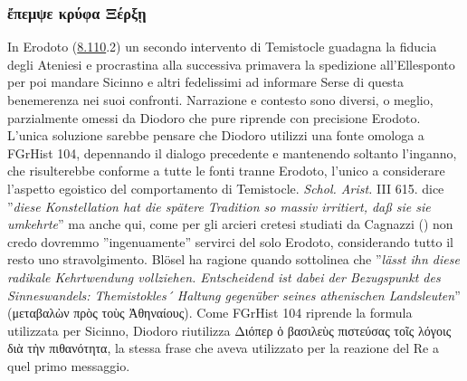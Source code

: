 {    \subsubsection{\textgreek{ἔπεμψε κρύφα Ξέρξῃ}}
    In Erodoto (\href{http://data.perseus.org/citations/urn:cts:greekLit:tlg0016.tlg001.perseus-grc1:8.110}{8.110}.2) un secondo intervento di Temistocle guadagna la fiducia degli Ateniesi e procrastina alla successiva primavera la spedizione all'Ellesponto per poi mandare Sicinno e altri fedelissimi ad informare Serse di questa benemerenza  nei suoi confronti. Narrazione e contesto sono diversi, o meglio, parzialmente omessi da  Diodoro che pure riprende con precisione Erodoto. L'unica soluzione sarebbe pensare che  Diodoro utilizzi una fonte omologa a FGrHist 104, depennando il dialogo precedente e mantenendo soltanto l'inganno, che risulterebbe conforme a tutte le fonti tranne Erodoto, l'unico a considerare l'aspetto egoistico del comportamento di Temistocle.\emph{ Schol. Arist.} III 615. \cite[260 n.27]{Blosel2004} dice ''\emph{diese Konstellation hat die spätere Tradition so massiv irritiert, daß sie sie umkehrte}''  ma anche qui, come per gli arcieri cretesi studiati da Cagnazzi (\cite*{Cagnazzi2003}) non credo dovremmo ''ingenuamente'' servirci del solo Erodoto, considerando tutto il resto uno stravolgimento. Blösel ha ragione quando sottolinea che ''\emph{lässt ihn diese radikale Kehrtwendung vollziehen. Entscheidend ist dabei der Bezugspunkt des Sinneswandels: Themistokles´ Haltung gegenüber seines athenischen Landsleuten}'' (\textgreek{μεταβαλὼν πρὸς τοὺς Ἀθηναίους}). Come FGrHist 104 riprende la formula utilizzata per Sicinno,  Diodoro riutilizza \textgreek{Διόπερ ὁ βασιλεὺς πιστεύσας τοῖς λόγοις διὰ τὴν πιθανότητα}, la stessa frase che aveva utilizzato per la reazione del Re a quel primo messaggio. 
}

